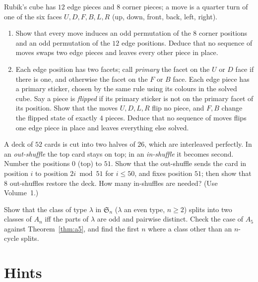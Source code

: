 \begin{exercise}[$\star\star$]\label{ex:rubik}
Rubik's cube has $12$ edge pieces and $8$ corner pieces; a move is a quarter turn of one of the six faces $U,D,F,B,L,R$ (up, down, front, back, left, right).
\begin{enumerate}[label=(\alph*)]
\item Show that every move induces an odd permutation of the $8$ corner positions and an odd permutation of the $12$ edge positions. Deduce that no sequence of moves swaps two edge pieces and leaves every other piece in place.
\item Each edge position has two facets; call \emph{primary} the facet on the $U$ or $D$ face if there is one, and otherwise the facet on the $F$ or $B$ face. Each edge piece has a primary sticker, chosen by the same rule using its colours in the solved cube. Say a piece is \emph{flipped} if its primary sticker is not on the primary facet of its position. Show that the moves $U,D,L,R$ flip no piece, and $F,B$ change the flipped state of exactly $4$ pieces. Deduce that no sequence of moves flips one edge piece in place and leaves everything else solved.
\end{enumerate}
\end{exercise}

\begin{exercise}[$\star\star$]\label{ex:shuffle}
A deck of $52$ cards is cut into two halves of $26$, which are interleaved perfectly. In an \emph{out-shuffle} the top card stays on top; in an \emph{in-shuffle} it becomes second. Number the positions $0$ (top) to $51$. Show that the out-shuffle sends the card in position $i$ to position $2i\bmod 51$ for $i\le50$, and fixes position $51$; then show that $8$ out-shuffles restore the deck. How many in-shuffles are needed? (Use Volume~1.)
\end{exercise}

\begin{exercise}[$\star\star\star$]\label{ex:split}
Show that the class of type $\lambda$ in $\mathfrak S_n$ ($\lambda$ an even type, $n\ge2$) splits into two classes of $A_n$ iff the parts of $\lambda$ are odd and pairwise distinct. Check the case of $A_5$ against Theorem~\ref{thm:a5}, and find the first $n$ where a class other than an $n$-cycle splits.
\end{exercise}

\section{Hints}

